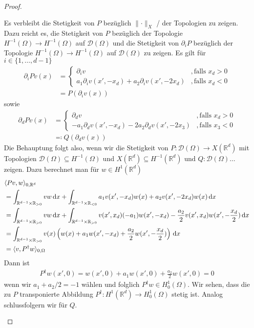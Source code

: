 \documentclass{scrartcl}
\def\R{\mathbb{R}}
\newcommand{\cD}{\mathcal{D}}
\newcommand{\dif}[1]{\,\mathrm{d} #1}
\newcommand{\norm}[1]{\lVert #1 \rVert}
\DeclarePairedDelimiter{\inner}{\langle}{\rangle}
\begin{document}
\begin{proof}
\begin{enumerate}
	Es verbleibt die Stetigkeit von $P$ bezüglich $\norm{\cdot}_X$ / der Topologien zu zeigen.
	Dazu reicht es, die Stetigkeit von $P$ bezüglich der Topologie $H^{-1}(\Omega)\to H^{-1}(\Omega)$ auf $\cD(\Omega)$ und die Stetigkeit von $\partial_iP$ bezüglich der Topologie $H^{-1}(\Omega)\to H^{-1}(\Omega)$ auf $\cD(\Omega)$ zu zeigen. Es gilt für $i\in\{1,\dots,d-1\}$
	\begin{align*}
		\partial_iPv(x) &= \begin{cases}
			\partial_i v &,\text{falls }x_d>0 \\
			a_1\partial_iv(x',-x_d)+a_2\partial_iv(x',-2x_d) &,\text{falls }x_d<0
		\end{cases} \\
		&= P(\partial_iv(x))
	\end{align*}	
	sowie
	\begin{align*}
		\partial_dPv(x) &= \begin{cases}
			\partial_dv &,\text{falls }x_d>0 \\
			-a_1\partial_dv(x',-x_d)-2a_2\partial_dv(x',-2x_3) &,\text{falls }x_3<0
		\end{cases} \\
		&\eqqcolon Q(\partial_dv(x))
	\end{align*}
	Die Behauptung folgt also, wenn wir die Stetigkeit von $P\colon\cD(\Omega)\to X(\R^d)$ mit Topologien $\cD(\Omega)\subseteq H^{-1}(\Omega)$ und $X(\R^d)\subseteq H^{-1}(\R^d)$ und $Q\colon\cD(\Omega)\dots$ zeigen. Dazu berechnet man für $w\in H^1(\R^d)$
	\begin{align*}
		&\inner{Pv,w}_{0,\R^d} \\
		&= \int_{\R^{d-1}\times\R_{>0}}vw\dif x + \int_{\R^{d-1}\times\R_{<0}}a_1v(x',-x_d)w(x)+a_2v(x',-2x_d)w(x)\dif x \\
		&= \int_{\R^{d-1}\times\R_{>0}}vw\dif x +\int_{\R^{d-1}\times\R_{>0}}v(x',x_d)(- a_1)w(x',-x_d)-\frac{a_2}{2}v(x',x_d)w(x',-\frac{x_d}{2})\dif x \\
		&= \int_{\R^{d-1}\times\R_{>0}}v(x)\left(w(x) + a_1w(x',-x_d)+\frac{a_2}{2}w(x',-\frac{x_d}{2})\right)\dif x \\
		&= \inner{v,P^\dagger w}_{0,\Omega}
	\end{align*}
	Dann ist	
	\begin{align*}
		P^\dagger w(x',0) = w(x',0) + a_1w(x',0)+\frac{a_2}{2}w(x',0) = 0
	\end{align*}
	wenn wir $a_1+a_2/2=-1$ wählen und folglich $P^\dagger w\in H^1_0(\Omega)$. Wir sehen, dass die zu $P$ transponierte Abbildung $P^\dagger\colon H^1(\R^d)\to H^1_0(\Omega)$ stetig ist. Analog schlussfolgern wir für $Q$.
	

\end{enumerate}
\end{proof}
\end{document}
